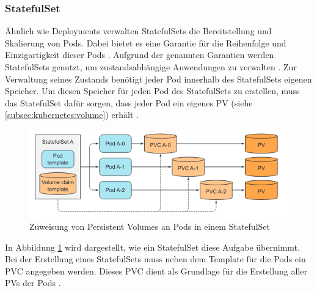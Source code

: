 \subsubsection{StatefulSet}
\label{subsec:kubernetes:statefulset}
Ähnlich wie Deployments verwalten StatefulSets die Bereitstellung und Skalierung von Pods.
Dabei bietet es eine Garantie für die Reihenfolge und Einzigartigkeit dieser Pods \cite{kubernetesStatefulSets}.
Aufgrund der genannten Garantien werden StatefulSets genutzt, um zustandsabhängige Anwendungen zu verwalten \cite{kubernetesStatefulSets}.
Zur Verwaltung seines Zustands benötigt jeder Pod innerhalb des StatefulSets eigenen Speicher.
Um diesen Speicher für jeden Pod des StatefulSets zu erstellen, muss das StatefulSet dafür sorgen, 
dass jeder Pod ein eigenes \ac{PV} (siehe \ref{subsec:kubernetes:volume}) erhält \cite{Marko2018}.
\begin{figure}[h]
  \centering
  \includegraphics[width=\textwidth]{gfx/chapters/2_grundlagen/statefulsets.png}
  \caption{Zuweisung von Persistent Volumes an Pods in einem StatefulSet}
  \label{fig:kubernetes:statefulsets}
\end{figure}
In Abbildung \ref{fig:kubernetes:statefulsets} wird dargestellt, wie ein StatefulSet diese Aufgabe übernimmt.
Bei der Erstellung eines StatefulSets muss neben dem Template für die Pods ein \ac{PVC} angegeben werden. 
Dieses \ac{PVC} dient als Grundlage für die Erstellung aller \acp{PV} der Pods \cite{Marko2018}.